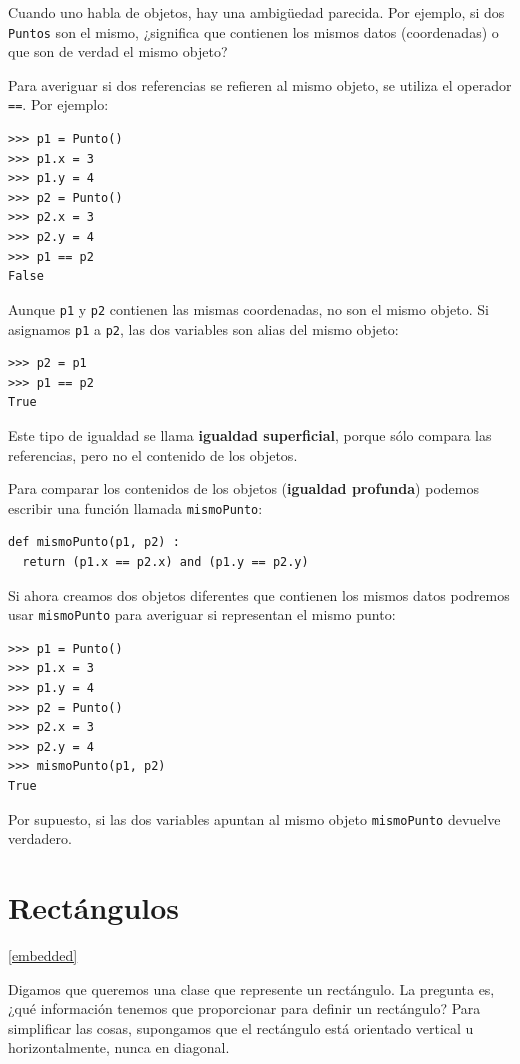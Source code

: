 Cuando uno habla de objetos, hay una ambigüedad parecida. Por ejemplo,
si dos \texttt{Puntos} son el mismo, ¿significa que contienen los mismos datos
(coordenadas) o que son de verdad el mismo objeto?

Para averiguar si dos referencias se refieren al mismo objeto, se utiliza el
operador \texttt{==}. Por ejemplo:

\beforeverb
\begin{verbatim}
>>> p1 = Punto()
>>> p1.x = 3
>>> p1.y = 4
>>> p2 = Punto()
>>> p2.x = 3
>>> p2.y = 4
>>> p1 == p2
False
\end{verbatim}
\afterverb
%
Aunque \texttt{p1} y \texttt{p2} contienen las mismas coordenadas, no son
el mismo objeto. Si asignamos \texttt{p1} a \texttt{p2}, las dos variables son
alias del mismo objeto:

\beforeverb
\begin{verbatim}
>>> p2 = p1
>>> p1 == p2
True
\end{verbatim}
\afterverb
%
Este tipo de igualdad se llama {\bf igualdad superficial}, porque sólo
compara las referencias, pero no el contenido de los objetos.


Para comparar los contenidos de los objetos ({\bf igualdad profunda}) podemos
escribir una función llamada \texttt{mismoPunto}:

\beforeverb
\begin{verbatim}
def mismoPunto(p1, p2) :
  return (p1.x == p2.x) and (p1.y == p2.y)
\end{verbatim}
\afterverb
%
Si ahora creamos dos objetos diferentes que contienen los mismos datos
podremos usar \texttt{mismoPunto} para averiguar si representan el mismo punto:

\beforeverb
\begin{verbatim}
>>> p1 = Punto()
>>> p1.x = 3
>>> p1.y = 4
>>> p2 = Punto()
>>> p2.x = 3
>>> p2.y = 4
>>> mismoPunto(p1, p2)
True
\end{verbatim}
\afterverb
%
Por supuesto, si las dos variables apuntan al mismo objeto \texttt{mismoPunto}
devuelve verdadero.


\section{Rectángulos}
\ref{embedded}

Digamos que queremos una clase que represente un rectángulo. La pregunta es,
¿qué información tenemos que proporcionar para definir un rectángulo? Para
simplificar las cosas, supongamos que el rectángulo está orientado vertical u
horizontalmente, nunca en diagonal.

